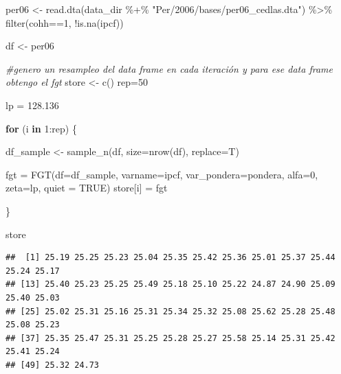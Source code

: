 \documentclass[
]{book}
\newenvironment{Shaded}{\begin{snugshade}}{\end{snugshade}}
\newcommand{\AttributeTok}[1]{\textcolor[rgb]{0.77,0.63,0.00}{#1}}
\newcommand{\CommentTok}[1]{\textcolor[rgb]{0.56,0.35,0.01}{\textit{#1}}}
\newcommand{\ConstantTok}[1]{\textcolor[rgb]{0.00,0.00,0.00}{#1}}
\newcommand{\ControlFlowTok}[1]{\textcolor[rgb]{0.13,0.29,0.53}{\textbf{#1}}}
\newcommand{\DecValTok}[1]{\textcolor[rgb]{0.00,0.00,0.81}{#1}}
\newcommand{\FloatTok}[1]{\textcolor[rgb]{0.00,0.00,0.81}{#1}}
\newcommand{\FunctionTok}[1]{\textcolor[rgb]{0.00,0.00,0.00}{#1}}
\newcommand{\NormalTok}[1]{#1}
\newcommand{\OtherTok}[1]{\textcolor[rgb]{0.56,0.35,0.01}{#1}}
\newcommand{\SpecialCharTok}[1]{\textcolor[rgb]{0.00,0.00,0.00}{#1}}
\newcommand{\StringTok}[1]{\textcolor[rgb]{0.31,0.60,0.02}{#1}}
\begin{document}
\begin{Shaded}
\begin{Highlighting}[]
\NormalTok{per06 }\OtherTok{\textless{}{-}} \FunctionTok{read.dta}\NormalTok{(data\_dir }\SpecialCharTok{\%+\%} \StringTok{"Per/2006/bases/per06\_cedlas.dta"}\NormalTok{) }\SpecialCharTok{\%\textgreater{}\%} 
        \FunctionTok{filter}\NormalTok{(cohh}\SpecialCharTok{==}\DecValTok{1}\NormalTok{, }\SpecialCharTok{!}\FunctionTok{is.na}\NormalTok{(ipcf))}

\NormalTok{df }\OtherTok{\textless{}{-}}\NormalTok{ per06}

\CommentTok{\#genero un resampleo del data frame en cada iteración y para ese data frame obtengo el fgt}
\NormalTok{store }\OtherTok{\textless{}{-}} \FunctionTok{c}\NormalTok{()}
\NormalTok{rep}\OtherTok{=}\DecValTok{50}

\NormalTok{lp }\OtherTok{=} \FloatTok{128.136}

\ControlFlowTok{for}\NormalTok{ (i }\ControlFlowTok{in} \DecValTok{1}\SpecialCharTok{:}\NormalTok{rep) \{}
  
\NormalTok{   df\_sample }\OtherTok{\textless{}{-}} \FunctionTok{sample\_n}\NormalTok{(df, }\AttributeTok{size=}\FunctionTok{nrow}\NormalTok{(df), }\AttributeTok{replace=}\NormalTok{T)}
   
\NormalTok{   fgt }\OtherTok{=} \FunctionTok{FGT}\NormalTok{(}\AttributeTok{df=}\NormalTok{df\_sample, }\AttributeTok{varname=}\NormalTok{ipcf, }\AttributeTok{var\_pondera=}\NormalTok{pondera, }\AttributeTok{alfa=}\DecValTok{0}\NormalTok{, }\AttributeTok{zeta=}\NormalTok{lp, }\AttributeTok{quiet =} \ConstantTok{TRUE}\NormalTok{)}
\NormalTok{   store[i] }\OtherTok{=}\NormalTok{ fgt}
   
\NormalTok{\}}
\end{Highlighting}
\end{Shaded}

\begin{Shaded}
\begin{Highlighting}[]
\NormalTok{store}
\end{Highlighting}
\end{Shaded}

\begin{verbatim}
##  [1] 25.19 25.25 25.23 25.04 25.35 25.42 25.36 25.01 25.37 25.44 25.24 25.17
## [13] 25.40 25.23 25.25 25.49 25.18 25.10 25.22 24.87 24.90 25.09 25.40 25.03
## [25] 25.02 25.31 25.16 25.31 25.34 25.32 25.08 25.62 25.28 25.48 25.08 25.23
## [37] 25.35 25.47 25.31 25.25 25.28 25.27 25.58 25.14 25.31 25.42 25.41 25.24
## [49] 25.32 24.73
\end{verbatim}
\end{document}
